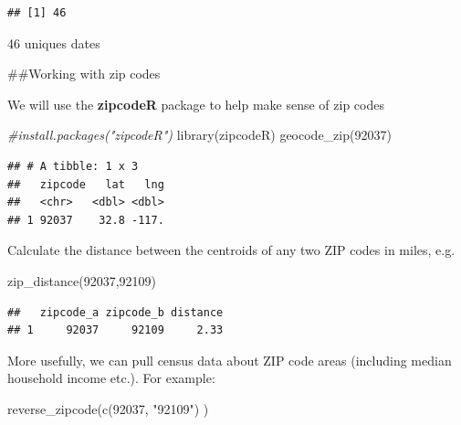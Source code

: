 \documentclass[
]{article}
\newenvironment{Shaded}{\begin{snugshade}}{\end{snugshade}}
\newcommand{\CommentTok}[1]{\textcolor[rgb]{0.56,0.35,0.01}{\textit{#1}}}
\newcommand{\FunctionTok}[1]{\textcolor[rgb]{0.00,0.00,0.00}{#1}}
\newcommand{\NormalTok}[1]{#1}
\newcommand{\StringTok}[1]{\textcolor[rgb]{0.31,0.60,0.02}{#1}}
\begin{document}
\begin{verbatim}
## [1] 46
\end{verbatim}

46 uniques dates

\#\#Working with zip codes

We will use the \textbf{zipcodeR} package to help make sense of zip
codes

\begin{Shaded}
\begin{Highlighting}[]
\CommentTok{\#install.packages("zipcodeR")}
\FunctionTok{library}\NormalTok{(zipcodeR)}
\FunctionTok{geocode\_zip}\NormalTok{(}\StringTok{\textquotesingle{}92037\textquotesingle{}}\NormalTok{)}
\end{Highlighting}
\end{Shaded}

\begin{verbatim}
## # A tibble: 1 x 3
##   zipcode   lat   lng
##   <chr>   <dbl> <dbl>
## 1 92037    32.8 -117.
\end{verbatim}

Calculate the distance between the centroids of any two ZIP codes in
miles, e.g.

\begin{Shaded}
\begin{Highlighting}[]
\FunctionTok{zip\_distance}\NormalTok{(}\StringTok{\textquotesingle{}92037\textquotesingle{}}\NormalTok{,}\StringTok{\textquotesingle{}92109\textquotesingle{}}\NormalTok{)}
\end{Highlighting}
\end{Shaded}

\begin{verbatim}
##   zipcode_a zipcode_b distance
## 1     92037     92109     2.33
\end{verbatim}

More usefully, we can pull census data about ZIP code areas (including
median household income etc.). For example:

\begin{Shaded}
\begin{Highlighting}[]
\FunctionTok{reverse\_zipcode}\NormalTok{(}\FunctionTok{c}\NormalTok{(}\StringTok{\textquotesingle{}92037\textquotesingle{}}\NormalTok{, }\StringTok{"92109"}\NormalTok{) )}
\end{Highlighting}
\end{Shaded}
\end{document}

